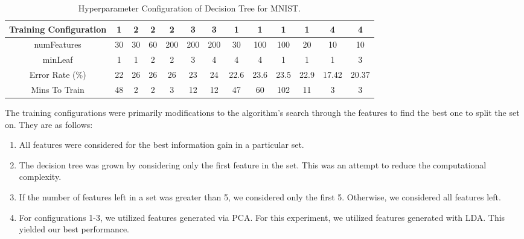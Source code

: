 \begin{table}[H]
  \centering
  \begin{tabular}{||c | c | c | c | c | c | c | c | c | c | c | c | c ||} 
    \hline
    Training Configuration & 1 & 2 & 2 & 2 & 3 & 3 & 1 & 1 & 1 & 1 & 4 & 4 \\
    \hline
    numFeatures & 30 & 30 & 60 & 200 & 200 & 200 & 30 & 100 & 100 &  20 & 10 & 10 \\
    \hline
    minLeaf & 1 & 1 & 2 & 2 & 3 & 4 & 4 & 4 & 1 & 1 & 1 & 3 \\
    \hline
    Error Rate (\%) & 22 & 26 & 26 & 26 & 23 & 24 & 22.6 & 23.6 & 23.5 & 22.9 & 17.42 & 20.37 \\
    \hline
    Mins To Train & 48 & 2 & 2 & 3 & 12 & 12 & 47 & 60 & 102 & 11 & 3 & 3 \\
    \hline
  \end{tabular}
  \caption{Hyperparameter Configuration of Decision Tree for MNIST.}
\end{table}

The training configurations were primarily modifications to the algorithm's search through the features to find the best one to split the set on. They are as follows:

%
\begin{enumerate}
\item All features were considered for the best information gain in a particular set.
\item The decision tree was grown by considering only the first feature in the set. This was an attempt to reduce the computational complexity.
\item If the number of features left in a set was greater than 5, we considered only the first 5. Otherwise, we considered all features left. 
\item For configurations 1-3, we utilized features generated via PCA. For this experiment, we utilized features generated with LDA. This yielded our best performance.
\end{enumerate}

\fi